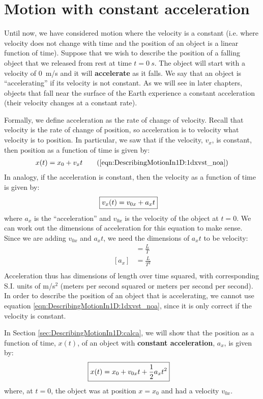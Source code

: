 \section{Motion with constant acceleration}
Until now, we have considered motion where the velocity is a constant (i.e. where velocity does not change with time and the position of an object is a linear function of time). Suppose that we wish to describe the position of a falling object that we released from rest at time $t=\SI{0}{s}$. The object will start with a velocity of \SI{0}{m/s} and it will \textbf{accelerate} as it falls. We say that an object is ``accelerating'' if its velocity is not constant. As we will see in later chapters, objects that fall near the surface of the Earth experience a constant acceleration (their velocity changes at a constant rate).

Formally, we define acceleration as the rate of change of velocity. Recall that velocity is the rate of change of position, so acceleration is to velocity what velocity is to position. In particular, we saw that if the velocity, $v_x$, is constant, then position as a function of time is given by:
\begin{align}
x(t) = x_0 + v_xt \tag{\ref{eqn:DescribingMotionIn1D:1dxvst_noa}}
\end{align} 
In analogy, if the acceleration is constant, then the velocity as a function of time is given by:
\begin{align}
\label{eqn:DescribingMotionIn1DL1dvvst}
\Aboxed{v_x(t) = v_{0x} + a_xt }
\end{align}
where $a_x$ is the ``acceleration'' and $v_{0x}$ is the velocity of the object at $t=0$. We can work out the dimensions of acceleration for this equation to make sense. Since we are adding $v_{0x}$ and $a_xt$, we need the dimensions of $a_xt$ to be velocity:
\begin{align*}
[a_xt] &= \frac{L}{T} \\
[a_x]&= \frac{L}{T^2} \\
\end{align*}
Acceleration thus has dimensions of length over time squared, with corresponding S.I. units of m/s$^2$ (meters per second squared or meters per second per second). In order to describe the position of an object that is accelerating, we cannot use equation \ref{eqn:DescribingMotionIn1D:1dxvst_noa}, since it is only correct if the velocity is constant. 

In Section \ref{sec:DescribingMotionIn1D:calca}, we will show that the position as a function of time, $x(t)$, of an object with \textbf{constant acceleration}, $a_x$, is given by:
\begin{align}
\label{eqn:DescribingMotionIn1D:1dxvst}
\Aboxed{ x(t) = x_0+v_{0x}t+ \frac{1}{2}a_xt^2}
\end{align}
where, at $t=0$, the object was at position $x=x_0$ and had a velocity $v_{0x}$.
 


